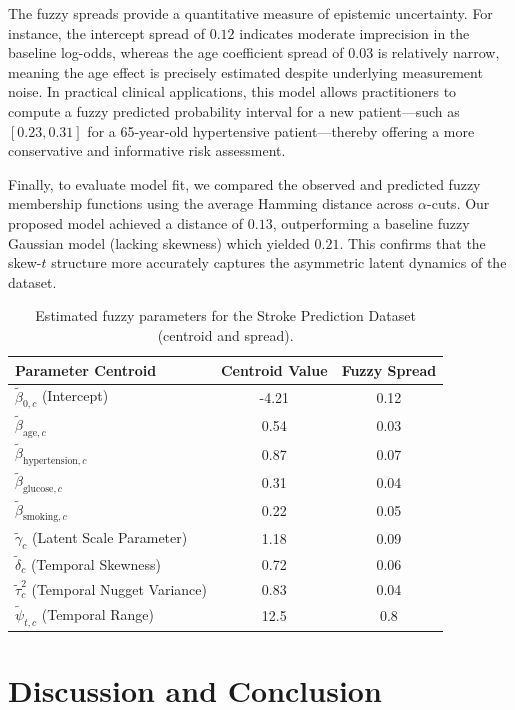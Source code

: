 \documentclass[twoside]{article}
\begin{document}
The fuzzy spreads provide a quantitative measure of epistemic uncertainty. For instance, the intercept spread of $0.12$ indicates moderate imprecision in the baseline log-odds, whereas the age coefficient spread of $0.03$ is relatively narrow, meaning the age effect is precisely estimated despite underlying measurement noise. In practical clinical applications, this model allows practitioners to compute a fuzzy predicted probability interval for a new patient—such as $[0.23, 0.31]$ for a 65-year-old hypertensive patient—thereby offering a more conservative and informative risk assessment.

Finally, to evaluate model fit, we compared the observed and predicted fuzzy membership functions using the average Hamming distance across $\alpha$-cuts. Our proposed model achieved a distance of $0.13$, outperforming a baseline fuzzy Gaussian model (lacking skewness) which yielded $0.21$. This confirms that the skew-$t$ structure more accurately captures the asymmetric latent dynamics of the dataset.
\begin{table}[!ht]
\centering
\caption{Estimated fuzzy parameters for the Stroke Prediction Dataset (centroid and spread).}\label{tab:stroke}
\begin{tabular}{lcc}
\hline
Parameter Centroid & Centroid Value & Fuzzy Spread \\ \hline
\(\tilde{\beta}_{0,c}\) (Intercept)             & -4.21 & 0.12 \\
\(\tilde{\beta}_{\text{age},c}\)                & 0.54  & 0.03 \\
\(\tilde{\beta}_{\text{hypertension},c}\)       & 0.87  & 0.07 \\
\(\tilde{\beta}_{\text{glucose},c}\)             & 0.31  & 0.04 \\
\(\tilde{\beta}_{\text{smoking},c}\)             & 0.22  & 0.05 \\
\(\tilde{\gamma}_c\) (Latent Scale Parameter)   & 1.18  & 0.09 \\
\(\tilde{\delta}_c\) (Temporal Skewness)        & 0.72  & 0.06 \\
\(\tilde{\tau}_c^2\) (Temporal Nugget Variance) & 0.83  & 0.04 \\
\(\tilde{\psi}_{t,c}\) (Temporal Range)         & 12.5  & 0.8  \\ \hline
\end{tabular}
\end{table}

\section*{Discussion and Conclusion}
\end{document}

